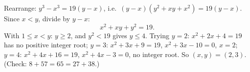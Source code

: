 Rearrange: $y^3-x^3=19(y-x)$, i.e.\ $(y-x)(y^2+xy+x^2)=19(y-x)$. Since $x<y$, divide by $y-x$:
\[
x^2+xy+y^2=19 .
\]
With $1\le x<y$: $y\ge2$, and $y^2<19$ gives $y\le4$. Trying $y=2$: $x^2+2x+4=19$ has no positive integer root; $y=3$: $x^2+3x+9=19$, $x^2+3x-10=0$, $x=2$; $y=4$: $x^2+4x+16=19$, $x^2+4x-3=0$, no integer root. So $(x,y)=\boxed{(2,3)}$. (Check: $8+57=65=27+38$.)

